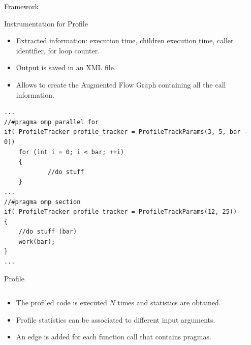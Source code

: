 \documentclass[xcolor=dvipsnames]{beamer}
\begin{document}
\begin{section}{Framework}
\begin{frame}[fragile]{\hskip 0.3cm Instrumentation for Profile}
\begin{itemize}
\item Extracted information: execution time, children execution time, caller identifier, for loop counter.

\item Output is saved in an XML file.

\item Allows to create the Augmented Flow Graph containing all the call information.

\end{itemize}


\begin{lstlisting}[language=CCC]
...
//#pragma omp parallel for
if( ProfileTracker profile_tracker = ProfileTrackParams(3, 5, bar - 0))
	for (int i = 0; i < bar; ++i)
	{
    		//do stuff
	}
...
//#pragma omp section
if( ProfileTracker profile_tracker = ProfileTrackParams(12, 25))
{
    //do stuff (bar)
    work(bar);
}
...
\end{lstlisting}

\end{frame}












\begin{frame}{\hskip 0.3cm Profile}

\begin{columns}

\begin{column}{5cm}
\begin{itemize}

\item The profiled code is executed $N$ times and statistics are obtained. 

\item Profile statistics can be associated to different input arguments.

\item An edge is added for each function call that contains pragmas.

\end{itemize}
\end{column}


\end{columns}
\end{frame}
\end{section}
\end{document}
